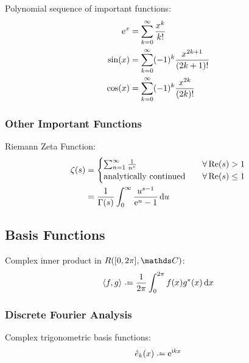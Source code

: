 			\noindent
			Polynomial sequence of important functions:
			\begin{equation}
				\begin{aligned}
					\mathrm{e}^x &= \sum_{k=0}^{\infty}{\frac{x^k}{k!}} \\
					\sin(x) &= \sum_{k=0}^\infty (-1)^k \frac{x^{2k+1}}{(2k+1)!} \\
					\cos(x) &= \sum_{k=0}^\infty (-1)^k \frac{x^{2k}}{(2k)!} \\
				\end{aligned}
			\end{equation}

		\subsubsection{Other Important Functions}
			Riemann Zeta Function:
			\begin{equation}
				\begin{aligned}
					\zeta(s) &= \begin{cases}
						\sum_{n=1}^{\infty} \frac{1}{n^s} \quad &\forall \Re(s) > 1\\
						\text{analytically continued} \quad &\forall \Re(s) \le 1\\
					\end{cases} \\
					&= \frac{1}{\Gamma(s)}\int_{0}^{\infty} \frac{u^{s-1}}{\mathrm{e}^u-1} \dd{u} \\
				\end{aligned}
			\end{equation}

	\subsection{Basis Functions}
		\noindent
		Complex inner product in $R([0,2\pi],\complex )$:
		\begin{equation}
			\left<f,g\right>\defeq \frac{1}{2\pi}\int_0^{2\pi} f(x)g^* (x)\dd{x}
		\end{equation}

		\subsubsection{Discrete Fourier Analysis}
			\noindent
			Complex trigonometric basis functions:
			\begin{equation}
				\hat{e}_k(x)\defeq \ex^{\i kx}
			\end{equation}

